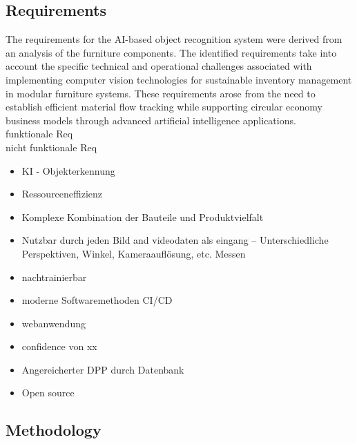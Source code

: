\documentclass[3p,times,procedia]{elsarticle}
\begin{document}
\subsection{Requirements}

The requirements for the AI-based object recognition system were derived from an analysis of the furniture components. The identified requirements take into account the specific technical and operational challenges associated with implementing computer vision technologies for sustainable inventory management in modular furniture systems. These requirements arose from the need to establish efficient material flow tracking while supporting circular economy business models through advanced artificial intelligence applications.\\

funktionale Req\\

nicht funktionale Req\\

\begin{itemize}
    \item KI - Objekterkennung
    \item Ressourceneffizienz
    \item Komplexe Kombination der Bauteile  und Produktvielfalt
    \item Nutzbar durch jeden Bild and videodaten als eingang --\> Unterschiedliche Perspektiven, Winkel, Kameraauflösung, etc. Messen 
    \item nachtrainierbar
    \item moderne Softwaremethoden CI/CD
    \item webanwendung
    \item confidence von xx %
    \item Angereicherter DPP durch Datenbank
    \item Open source 
\end{itemize}


\subsection{Methodology}

\end{document}
